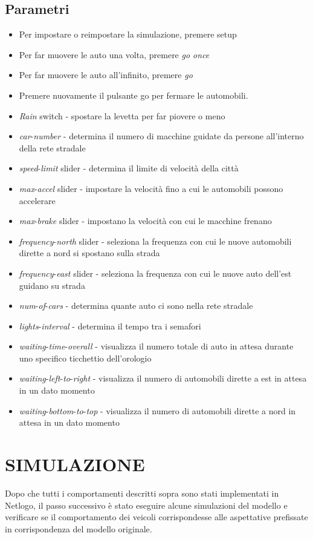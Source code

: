 \documentclass[11pt]{article}
\begin{document}
\subsection{Parametri}
\begin{itemize}
\item Per impostare o reimpostare la simulazione, premere setup
\item Per far muovere le auto una volta, premere \textit{go once}
\item Per far muovere le auto all'infinito, premere \textit{go}
\item Premere nuovamente il pulsante go per fermare le automobili.
\item \textit{Rain} switch - spostare la levetta per far piovere o meno
\item \textit{car}-\textit{number} - determina il numero di macchine guidate da persone all'interno della rete stradale
\item \textit{speed}-\textit{limit} slider - determina il limite di velocità della città
\item \textit{max}-\textit{accel} slider - impostare la velocità fino a cui le automobili possono accelerare
\item \textit{max}-\textit{brake} slider - impostano la velocità con cui le macchine frenano
\item \textit{frequency}-\textit{north} slider - seleziona la frequenza con cui le nuove automobili dirette a nord si spostano sulla strada
\item \textit{frequency}-\textit{east} slider - seleziona la frequenza con cui le nuove auto dell'est guidano su strada
\item \textit{num}-\textit{of}-\textit{cars} - determina quante auto ci sono nella rete stradale
\item \textit{lights}-\textit{interval} - determina il tempo tra i semafori
\item \textit{waiting}-\textit{time}-\textit{overall} - visualizza il numero totale di auto in attesa durante uno specifico ticchettio dell'orologio
\item \textit{waiting}-\textit{left}-\textit{to}-\textit{right} - visualizza il numero di automobili dirette a est in attesa in un dato momento
\item \textit{waiting}-\textit{bottom}-\textit{to}-\textit{top} - visualizza il numero di automobili dirette a nord in attesa in un dato momento
\end{itemize}


\section{SIMULAZIONE}
Dopo che tutti i comportamenti descritti sopra sono stati implementati in Netlogo, il passo successivo è stato eseguire alcune simulazioni del modello e verificare se il comportamento dei veicoli corrispondesse alle aspettative prefissate in corrispondenza del modello originale. 
\end{document}

